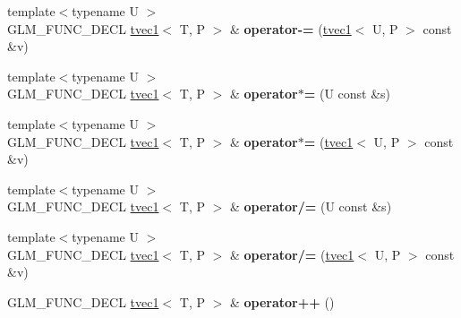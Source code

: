 \begin{DoxyCompactItemize}
\item 
{\footnotesize template$<$typename U $>$ }\\G\+L\+M\+\_\+\+F\+U\+N\+C\+\_\+\+D\+E\+CL \hyperlink{structglm_1_1detail_1_1tvec1}{tvec1}$<$ T, P $>$ \& {\bfseries operator-\/=} (\hyperlink{structglm_1_1detail_1_1tvec1}{tvec1}$<$ U, P $>$ const \&v)\hypertarget{structglm_1_1detail_1_1tvec1_af8992bb613669f1a7aa0ff41a4fd31e3}{}\label{structglm_1_1detail_1_1tvec1_af8992bb613669f1a7aa0ff41a4fd31e3}

\item 
{\footnotesize template$<$typename U $>$ }\\G\+L\+M\+\_\+\+F\+U\+N\+C\+\_\+\+D\+E\+CL \hyperlink{structglm_1_1detail_1_1tvec1}{tvec1}$<$ T, P $>$ \& {\bfseries operator$\ast$=} (U const \&s)\hypertarget{structglm_1_1detail_1_1tvec1_a7ca0f64a6ab86fa34d4b5f23a9db58d2}{}\label{structglm_1_1detail_1_1tvec1_a7ca0f64a6ab86fa34d4b5f23a9db58d2}

\item 
{\footnotesize template$<$typename U $>$ }\\G\+L\+M\+\_\+\+F\+U\+N\+C\+\_\+\+D\+E\+CL \hyperlink{structglm_1_1detail_1_1tvec1}{tvec1}$<$ T, P $>$ \& {\bfseries operator$\ast$=} (\hyperlink{structglm_1_1detail_1_1tvec1}{tvec1}$<$ U, P $>$ const \&v)\hypertarget{structglm_1_1detail_1_1tvec1_ada2594a8dd2c0ec4e9a20ec18469668c}{}\label{structglm_1_1detail_1_1tvec1_ada2594a8dd2c0ec4e9a20ec18469668c}

\item 
{\footnotesize template$<$typename U $>$ }\\G\+L\+M\+\_\+\+F\+U\+N\+C\+\_\+\+D\+E\+CL \hyperlink{structglm_1_1detail_1_1tvec1}{tvec1}$<$ T, P $>$ \& {\bfseries operator/=} (U const \&s)\hypertarget{structglm_1_1detail_1_1tvec1_aad8c386f7278e9a5685ada9a1a0ef7df}{}\label{structglm_1_1detail_1_1tvec1_aad8c386f7278e9a5685ada9a1a0ef7df}

\item 
{\footnotesize template$<$typename U $>$ }\\G\+L\+M\+\_\+\+F\+U\+N\+C\+\_\+\+D\+E\+CL \hyperlink{structglm_1_1detail_1_1tvec1}{tvec1}$<$ T, P $>$ \& {\bfseries operator/=} (\hyperlink{structglm_1_1detail_1_1tvec1}{tvec1}$<$ U, P $>$ const \&v)\hypertarget{structglm_1_1detail_1_1tvec1_ae74bb46e4d3fd5fdccb1ee6744cbf493}{}\label{structglm_1_1detail_1_1tvec1_ae74bb46e4d3fd5fdccb1ee6744cbf493}

\item 
G\+L\+M\+\_\+\+F\+U\+N\+C\+\_\+\+D\+E\+CL \hyperlink{structglm_1_1detail_1_1tvec1}{tvec1}$<$ T, P $>$ \& {\bfseries operator++} ()\hypertarget{structglm_1_1detail_1_1tvec1_ae4514c5de0b75209187c80ed65fdd392}{}\label{structglm_1_1detail_1_1tvec1_ae4514c5de0b75209187c80ed65fdd392}


\end{DoxyCompactItemize}
